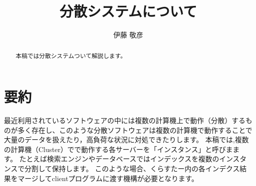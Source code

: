 \documentclass[a4paper, 10pt]{jarticle}
\title{分散システムについて}
\author{伊藤 敬彦}
\begin{document}
\maketitle
\begin{abstract}
本稿では分散システムついて解説します。
\end{abstract}

\section{要約}
最近利用されているソフトウェアの中には複数の計算機上で動作（分散）するものが多く存在し、このような分散ソフトウェアは複数の計算機で動作することで大量のデータを扱えたり，高負荷な状況に対処できたりします。
本稿では,複数の計算機（Cluster）でで動作する各サーバーを「インスタンス」と呼びまます。
たとえば検索エンジンやデータベースではインデックスを複数のインスタンスで分割して保持します。
このような場合、くらすたー内の各インデクス結果をマージしてclientプログラムに渡す機構が必要となります。

\end{document}
